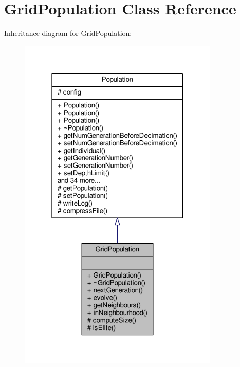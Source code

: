 \hypertarget{classGridPopulation}{}\section{Grid\+Population Class Reference}
\label{classGridPopulation}


Inheritance diagram for Grid\+Population\+:
\nopagebreak
\begin{figure}[H]
\begin{center}
\leavevmode
\includegraphics[width=271pt]{classGridPopulation__inherit__graph}
\end{center}
\end{figure}



